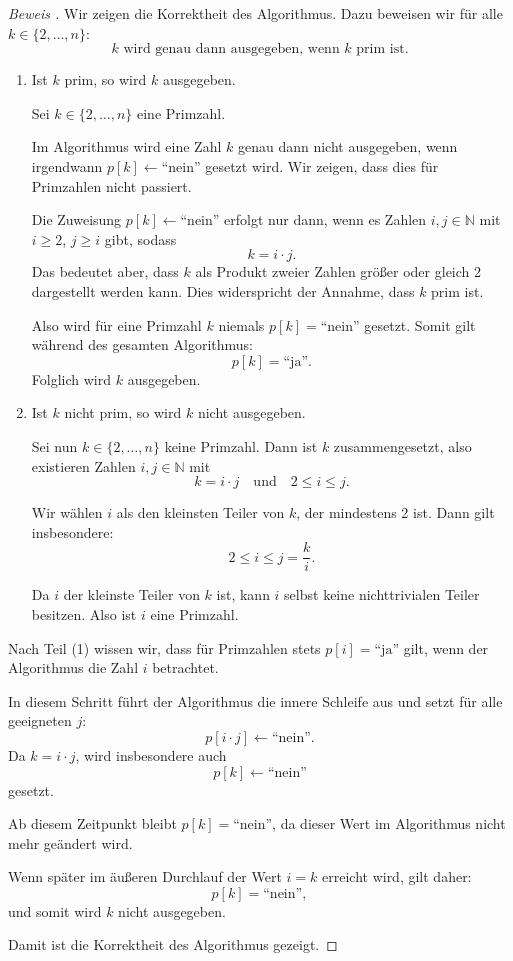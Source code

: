 \documentclass{article}
\begin{document}
\begin{proof}[Beweis %
] 
    
Wir zeigen die Korrektheit des Algorithmus. Dazu beweisen wir für alle 
\( k \in \{2, \dots, n\} \):
\[
k \text{ wird genau dann ausgegeben, wenn } k \text{ prim ist.}
\]

\medskip

\begin{enumerate}
    \item [1)]
    Ist \(k\) prim, so wird \(k\) ausgegeben.

Sei \(k \in \{2, \dots, n\}\) eine Primzahl. 

Im Algorithmus wird eine Zahl \(k\) genau dann nicht ausgegeben, wenn irgendwann 
\(p[k] \leftarrow \text{``nein''}\) gesetzt wird. Wir zeigen, dass dies für Primzahlen nicht passiert.

Die Zuweisung \(p[k] \leftarrow \text{``nein''}\) erfolgt nur dann, wenn es Zahlen 
\(i, j \in \mathbb{N}\) mit \(i \ge 2\), \(j \ge i\) gibt, sodass
\[
k = i \cdot j.
\]
Das bedeutet aber, dass \(k\) als Produkt zweier Zahlen größer oder gleich 2 dargestellt werden kann. 
Dies widerspricht der Annahme, dass \(k\) prim ist.

Also wird für eine Primzahl \(k\) niemals \(p[k] = \text{``nein''}\) gesetzt. Somit gilt während des gesamten Algorithmus:
\[
p[k] = \text{``ja''}.
\]
Folglich wird \(k\) ausgegeben.

\item[2)] 
Ist \(k\) nicht prim, so wird \(k\) nicht ausgegeben.

Sei nun \(k \in \{2, \dots, n\}\) keine Primzahl. Dann ist \(k\) zusammengesetzt, 
also existieren Zahlen \(i, j \in \mathbb{N}\) mit
\[
k = i \cdot j \quad \text{und} \quad 2 \le i \le j.
\]

Wir wählen \(i\) als den kleinsten Teiler von \(k\), der mindestens 2 ist. 
Dann gilt insbesondere:
\[
2 \le i \le j = \frac{k}{i}.
\]

Da \(i\) der kleinste Teiler von \(k\) ist, kann \(i\) selbst keine nichttrivialen 
Teiler besitzen. Also ist \(i\) eine Primzahl.

\end{enumerate} 


Nach Teil (1) wissen wir, dass für Primzahlen stets \(p[i] = \text{``ja''}\) gilt, 
wenn der Algorithmus die Zahl \(i\) betrachtet.

In diesem Schritt führt der Algorithmus die innere Schleife aus und setzt für alle 
geeigneten \(j\):
\[
p[i \cdot j] \leftarrow \text{``nein''}.
\]
Da \(k = i \cdot j\), wird insbesondere auch
\[
p[k] \leftarrow \text{``nein''}
\]
gesetzt.

Ab diesem Zeitpunkt bleibt \(p[k] = \text{``nein''}\), da dieser Wert im Algorithmus 
nicht mehr geändert wird.

Wenn später im äußeren Durchlauf der Wert \(i = k\) erreicht wird, gilt daher:
\[
p[k] = \text{``nein''},
\]
und somit wird \(k\) nicht ausgegeben.

\medskip

Damit ist die Korrektheit des Algorithmus gezeigt.

\end{proof}
\end{document}
